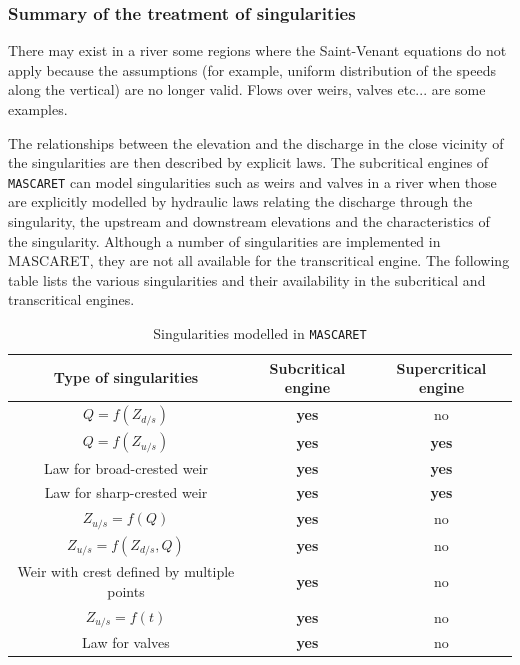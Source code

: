 \subsubsection{Summary of the treatment of singularities}

\label{BilanSing}

There may exist in a river some regions where the Saint-Venant equations do not apply because the assumptions (for example, uniform distribution of the speeds along the vertical) are no longer valid. Flows over weirs, valves etc... are some examples.

\vspace{0.5cm}

The relationships between the elevation and the discharge in the close vicinity of the singularities are then described by explicit laws. The subcritical engines of \texttt{MASCARET} can model singularities such as weirs and valves in a river when those are explicitly modelled by hydraulic laws relating the discharge through the singularity, the upstream and downstream elevations and the characteristics of the singularity. Although a number of singularities are implemented in MASCARET, they are not all available for the transcritical engine. The following table lists the various singularities and their availability in the subcritical and transcritical engines.

\begin{landscape}

\begin{table}
\centering
\caption{Singularities modelled in \texttt{MASCARET}}
\vspace{0.2cm}
\begin{tabular}{c|c|c}
  \textbf{Type of singularities} & \textbf{Subcritical engine} & \textbf{Supercritical engine} \\
  \hline
  $Q=f(Z_{d/s})$ & \textbf{yes} & no \\
  $Q=f(Z_{u/s})$ & \textbf{yes} & \textbf{yes} \\
  Law for broad-crested weir & \textbf{yes} & \textbf{yes} \\
  Law for sharp-crested weir & \textbf{yes} & \textbf{yes} \\
  $Z_{u/s}=f(Q)$ & \textbf{yes} & no \\
  $Z_{u/s}=f(Z_{d/s},Q)$ & \textbf{yes} & no \\
  Weir with crest defined by multiple points & \textbf{yes} & no \\
  $Z_{u/s}=f(t)$ & \textbf{yes} & no \\
  Law for valves & \textbf{yes} & no \\
  \hline
 \end{tabular}
 \label{TBL2}
\end{table}

\end{landscape}

